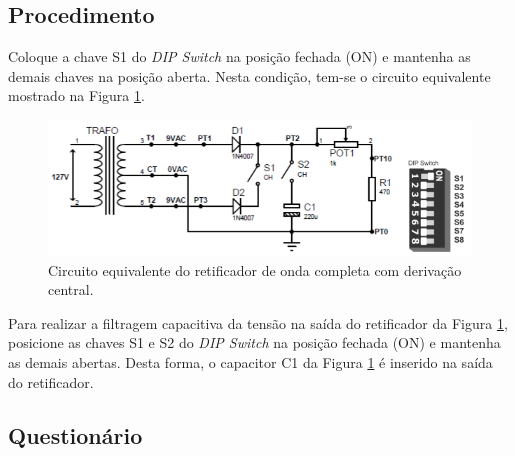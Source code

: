 \documentclass[11pt]{article}
\begin{document}
\subsection*{Procedimento}

Coloque a chave S1 do \textit{DIP Switch} na posição fechada (ON) e mantenha as demais chaves na posição aberta. Nesta condição, tem-se o circuito equivalente mostrado na Figura \ref{circ1}.

\begin{figure}[!htb]
\centering
\includegraphics[width=.7\textwidth]{RetificadorOndaCompleta.png}
\caption{Circuito equivalente do retificador de onda completa com derivação central.}
\label{circ1}
\end{figure}

Para realizar a filtragem capacitiva da tensão na saída do retificador da Figura \ref{circ1}, posicione as chaves S1 e S2 do \textit{DIP Switch} na posição fechada (ON) e mantenha as demais abertas. Desta forma, o capacitor C1 da Figura \ref{circ1} é inserido na saída do retificador.

\subsection*{Questionário}
\end{document}
